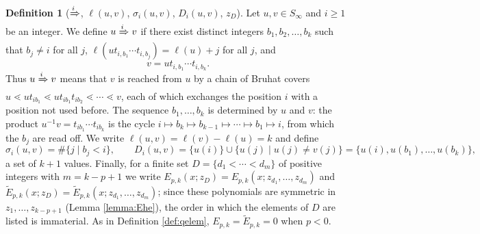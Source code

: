 \documentclass{amsart}
\theoremstyle{definition}
\newtheorem{definition}[lemma]{Definition}
\theoremstyle{remark}
\numberwithin{equation}{section}
\newcommand{\qelem}{\widetilde{E}}
\begin{document}
\begin{definition}[$\xRightarrow{i}$, $\ell(u,v)$, $\sigma_i(u,v)$, $D_i(u,v)$, $z_D$] \label{def:itom}
Let $u,v\in S_\infty$ and $i\geq 1$ be an integer. We define $u\xRightarrow{i} v$ if there exist distinct integers $b_1,b_2,\ldots,b_k$ such that $b_j\neq i$ for all $j$, $\ell(ut_{i,b_1}\cdots t_{i,b_j})=\ell(u)+j$ for all $j$, and 
$$v=ut_{i,b_1}\cdots t_{i,b_k}.$$
Thus $u\xRightarrow{i}v$ means that $v$ is reached from $u$ by a chain of Bruhat covers $u\lessdot ut_{ib_1}\lessdot ut_{ib_1}t_{ib_2}\lessdot\cdots\lessdot v$, each of which exchanges the position $i$ with a position not used before. The sequence $b_1,\ldots,b_k$ is determined by $u$ and $v$: the product $u^{-1}v=t_{ib_1}\cdots t_{ib_k}$ is the cycle $i\mapsto b_k\mapsto b_{k-1}\mapsto\cdots\mapsto b_1\mapsto i$, from which the $b_j$ are read off. We write $\ell(u,v)=\ell(v)-\ell(u)=k$ and define
$$\sigma_i(u,v)=\#\{j\mid b_j<i\},\qquad D_i(u,v)=\{u(i)\}\cup\{u(j)\mid u(j)\neq v(j)\}=\{u(i),u(b_1),\ldots,u(b_k)\},$$
a set of $k+1$ values. Finally, for a finite set $D=\{d_1<\cdots<d_m\}$ of positive integers with $m=k-p+1$ we write $E_{p,k}(x;z_D)=E_{p,k}(x;z_{d_1},\ldots,z_{d_m})$ and $\qelem_{p,k}(x;z_D)=\qelem_{p,k}(x;z_{d_1},\ldots,z_{d_m})$; since these polynomials are symmetric in $z_1,\ldots,z_{k-p+1}$ (Lemma \ref{lemma:Ehe}), the order in which the elements of $D$ are listed is immaterial. As in Definition \ref{def:qelem}, $E_{p,k}=\qelem_{p,k}=0$ when $p<0$.
\end{definition}
\end{document}
